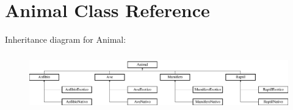 \hypertarget{class_animal}{}\section{Animal Class Reference}
\label{class_animal}
Inheritance diagram for Animal\+:\begin{figure}[H]
\begin{center}
\leavevmode
\includegraphics[height=2.456141cm]{class_animal}
\end{center}
\end{figure}
